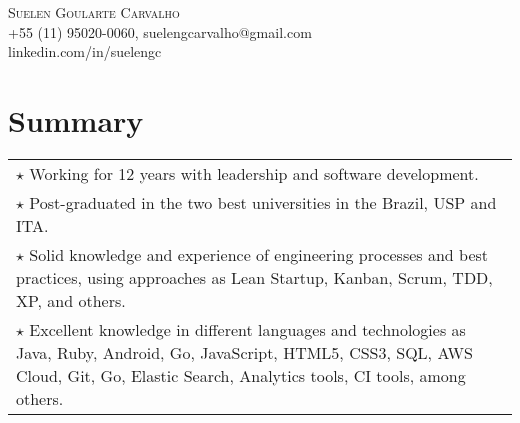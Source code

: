 \documentclass[a4paper, oneside, final]{scrartcl}
\newcommand{\vspc}{\vspace{0.15cm}} %
\begin{document}
\begin{center}
\textsc{\Huge{Suelen Goularte Carvalho}} \vspc\\
{\small +55 (11) 95020-0060, suelengcarvalho@gmail.com} \vspc\\
{\small linkedin.com/in/suelengc}






\section{Summary}
\begin{tabularx}{1\linewidth}{X}

$\star$ Working for 12 years with leadership and software development. \vspc \\

$\star$ Post-graduated in the two best universities in the Brazil, USP and ITA. \vspc \\

$\star$ Solid knowledge and experience of engineering processes and best practices, using approaches as Lean Startup, Kanban, Scrum, TDD, XP, and others. \vspc \\

$\star$ Excellent knowledge in different languages and technologies as Java, Ruby, Android, Go, JavaScript, HTML5, CSS3, SQL, AWS Cloud, Git, Go, Elastic Search, Analytics tools, CI tools, among others. \vspc \\


\end{tabularx}
\end{center}
\end{document}
